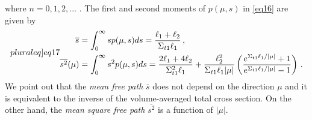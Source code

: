 \documentclass[12pt]{article}
\begin{document}
where $n=0, 1, 2, ...$ .
The first and second moments of $p(\mu,s)$ in \cref{eq16} are given by
\begin{subequations}\label[pluraleq]{eq17}
\begin{align}
\overline{s} &= \int_0^\infty sp(\mu,s)ds = \frac{\ell_1+\ell_2}{\Sigma_{t1}\ell_1}\, ,\\
\overline{s^2}(\mu) &= \int_0^\infty s^2p(\mu,s)ds = \frac{2\ell_1+4\ell_2}{\Sigma_{t1}^2\ell_1}+\frac{\ell_2^2}{\Sigma_{t1}\ell_1|\mu|}\left(\frac{e^{\Sigma_{t1}\ell_1/|\mu|}+1}{e^{\Sigma_{t1}\ell_1/|\mu|}-1}\right)\, .
\end{align}
\end{subequations}
We point out that the {\em mean free path} $\overline{s}$ does not depend on the direction $\mu$ and it is equivalent to the inverse of the volume-averaged total cross section.
On the other hand, the {\em mean square free path} $\overline{s^2}$ is a function of $|\mu|$.
\end{document}
